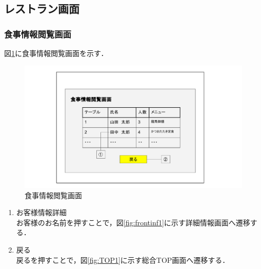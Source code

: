﻿
\subsection{レストラン画面}
\subsubsection{食事情報閲覧画面}
図\ref{fig:restaurant}に食事情報閲覧画面を示す．
\begin{figure}[H]
 \centering
   \includegraphics[width=150mm]{UI-restaurant/user-restarant00.pdf}
 \caption{食事情報閲覧画面}
 \label{fig:restaurant}
\end{figure}

\begin{enumerate}
\renewcommand{\labelenumi}{\textcircled{\scriptsize \theenumi}}
\item お客様情報詳細 \\ お客様のお名前を押すことで，図\ref{fig:frontinf1}に示す詳細情報画面へ遷移する．
\item 戻る \\戻るを押すことで，図\ref{fig:TOP1}に示す総合TOP画面へ遷移する．
\end{enumerate}
